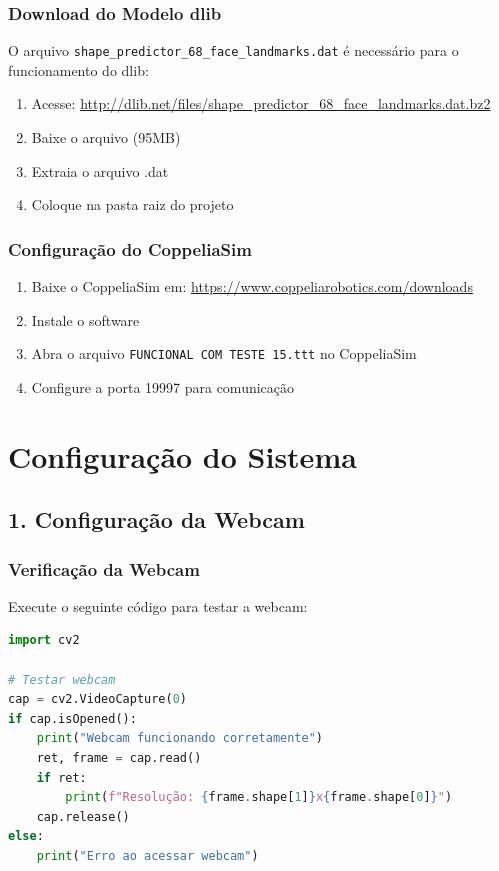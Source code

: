 \documentclass[12pt,a4paper]{article}
\begin{document}
\subsubsection{Download do Modelo dlib}

O arquivo \texttt{shape\_predictor\_68\_face\_landmarks.dat} é necessário para o funcionamento do dlib:

\begin{enumerate}
    \item Acesse: \url{http://dlib.net/files/shape_predictor_68_face_landmarks.dat.bz2}
    \item Baixe o arquivo (95MB)
    \item Extraia o arquivo .dat
    \item Coloque na pasta raiz do projeto
\end{enumerate}

\subsubsection{Configuração do CoppeliaSim}

\begin{enumerate}
    \item Baixe o CoppeliaSim em: \url{https://www.coppeliarobotics.com/downloads}
    \item Instale o software
    \item Abra o arquivo \texttt{FUNCIONAL COM TESTE 15.ttt} no CoppeliaSim
    \item Configure a porta 19997 para comunicação
\end{enumerate}

\section{Configuração do Sistema}

\subsection{1. Configuração da Webcam}

\subsubsection{Verificação da Webcam}

Execute o seguinte código para testar a webcam:

\begin{lstlisting}[language=python]
import cv2

# Testar webcam
cap = cv2.VideoCapture(0)
if cap.isOpened():
    print("Webcam funcionando corretamente")
    ret, frame = cap.read()
    if ret:
        print(f"Resolução: {frame.shape[1]}x{frame.shape[0]}")
    cap.release()
else:
    print("Erro ao acessar webcam")
\end{lstlisting}
\end{document}
